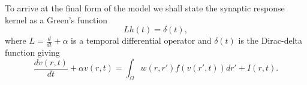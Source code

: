 \documentclass[onecolumn,draftcls]{IEEEtran}
\begin{document}
To arrive at the final form of the model we shall state the synaptic response kernel as a Green's function
\begin{equation}\label{GreensFuncDef}
	Lh\left( t \right) = \delta \left( t \right),
\end{equation}
where $L=\frac{d}{dt} + \alpha$ is a temporal differential operator and $\delta(t)$ is the Dirac-delta function giving 
\begin{equation}\label{FinalForm1}
	\frac{dv\left( r,t \right)}{dt} + \alpha v\left( r,t \right) = \int_\Omega  {w\left( r,r' \right)f\left( {v\left( r',t \right)} \right)dr'} + I\left(r,t\right).
\end{equation}
\end{document}
